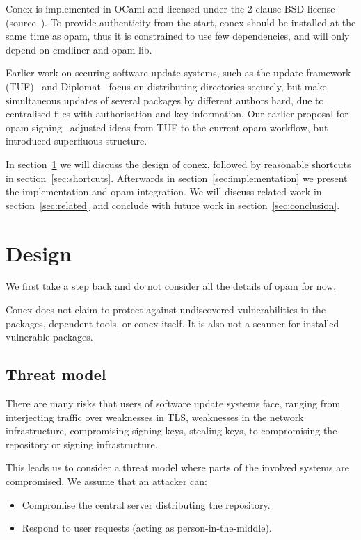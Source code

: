 \documentclass[nocopyrightspace]{sigplanconf}
\begin{document}
Conex is implemented in OCaml and licensed under the 2-clause BSD license (source~\cite{conex}).
To provide authenticity from the start, conex should be installed at the same time as opam, thus it is constrained to use few dependencies, and will only depend on cmdliner and opam-lib.

Earlier work on securing software update systems, such as the update framework (TUF)~\cite{tuf} and Diplomat~\cite{diplomat} focus on distributing directories securely, but make simultaneous updates of several packages by different authors hard, due to centralised files with authorisation and key information.
Our earlier proposal for opam signing~\cite{opamsigning} adjusted ideas from TUF to the current opam workflow, but introduced superfluous structure.

In section~\ref{sec:design} we will discuss the design of conex, followed by reasonable shortcuts in section~\ref{sec:shortcuts}.
Afterwards in section~\ref{sec:implementation} we present the implementation and opam integration.
We will discuss related work in section~\ref{sec:related} and conclude with future work in section~\ref{sec:conclusion}.

\section{Design} \label{sec:design}
We first take a step back and do not consider all the details of opam for now.

Conex does not claim to protect against undiscovered vulnerabilities in the packages, dependent tools, or conex itself.
It is also not a scanner for installed vulnerable packages.

\subsection{Threat model}
There are many risks that users of software update systems face, ranging from interjecting traffic over weaknesses in TLS, weaknesses in the network infrastructure, compromising signing keys, stealing keys, to compromising the repository or signing infrastructure.

This leads us to consider a threat model where parts of the involved systems are compromised.  We assume that an attacker can:
\begin{itemize}
  \item Compromise the central server distributing the repository.
  \item Respond to user requests (acting as person-in-the-middle).
\end{itemize}
\end{document}
